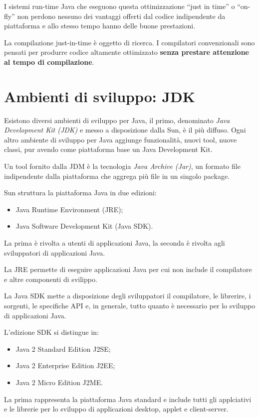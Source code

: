 \documentclass[12pt]{report}
\begin{document}
I sistemi run-time Java che eseguono questa ottimizzazione ``just in time'' o ``on-fly'' non perdono nessuno dei vantaggi offerti dal codice indipendente da piattaforma e allo stesso tempo hanno delle buone prestazioni.
\begin{note}{}{}
	La compilazione just-in-time è oggetto di ricerca. I compilatori convenzionali sono pensati per produrre codice altamente ottimizzato \textbf{senza prestare attenzione al tempo di compilazione}.
\end{note}

\section{Ambienti di sviluppo: JDK}
Esistono diversi ambienti di sviluppo per Java, il primo, denominato \textit{Java Development Kit (JDK)} e messo a disposizione dalla Sun, è il più diffuso. Ogni altro ambiente di sviluppo per Java aggiunge funzionalità, nuovi tool, nuove classi, pur avendo come piattaforma base un Java Development Kit.

Un tool fornito dalla JDM è la tecnologia \textit{Java Archive (Jar)}, un formato file indipendente dalla piattaforma che aggrega più file in un singolo package.

Sun struttura la piattaforma Java in due edizioni:
\begin{itemize}
	\item Java Runtime Environment (JRE);
	\item Java Software Development Kit (Java SDK).
\end{itemize}
La prima è rivolta a utenti di applicazioni Java, la seconda è rivolta agli sviluppatori di applicazioni Java.

La JRE permette di eseguire applicazioni Java per cui non include il compilatore e altre componenti di svilippo.

La Java SDK mette a disposizione degli sviluppatori il compilatore, le librerire, i sorgenti, le specifiche API e, in generale, tutto quanto è necessario per lo sviluppo di applicazioni Java.

L'edizione SDK si distingue in:
\begin{itemize}
	\item Java 2 Standard Edition J2SE;
	\item Java 2 Enterprise Edition J2EE;
	\item Java 2 Micro Edition J2ME.
\end{itemize}
La prima rappresenta la piattaforma Java standard e include tutti gli applciativi e le librerie per lo sviluppo di applicazioni desktop, applet e client-server.
\end{document}

